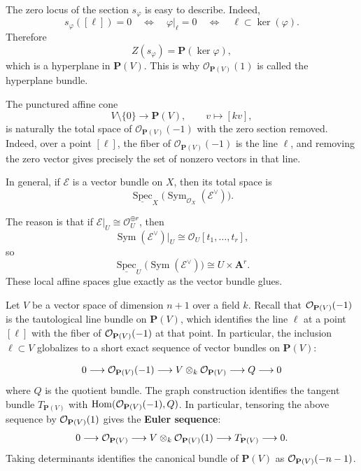 \documentclass[12pt]{article}
\begin{document}
The zero locus of the section \(s_\varphi\) is easy to describe. Indeed,
\[
    s_\varphi([\ell])=0
    \quad\Longleftrightarrow\quad
    \varphi|_\ell=0
    \quad\Longleftrightarrow\quad
    \ell\subset \ker(\varphi).
\]
Therefore
\[
    Z(s_\varphi)=\mathbf P(\ker \varphi),
\]
which is a hyperplane in \(\mathbf P(V)\). This is why \(\mathcal O_{\mathbf P(V)}(1)\) is called the hyperplane bundle.

\begin{remark}
    The punctured affine cone
    \[
        V\setminus \{0\}\longrightarrow \mathbf P(V),\qquad v\longmapsto [kv],
    \]
    is naturally the total space of \(\mathcal O_{\mathbf P(V)}(-1)\) with the zero section removed. Indeed, over a point \([\ell]\), the fiber of \(\mathcal O_{\mathbf P(V)}(-1)\) is the line \(\ell\), and removing the zero vector gives precisely the set of nonzero vectors in that line.
\end{remark}
In general, if \(\mathcal E\) is a vector bundle on \(X\), then its total space is
\[
    \underline{\operatorname{Spec}}_X\!\bigl(\operatorname{Sym}_{\mathcal O_X}(\mathcal E^\vee)\bigr).
\]

The reason is that if \(\mathcal E|_U \cong \mathcal O_U^{\oplus r}\), then
\[
    \operatorname{Sym}(\mathcal E^\vee)|_U
    \cong
    \mathcal O_U[t_1,\dots,t_r],
\]
so
\[
    \underline{\operatorname{Spec}}_U\!\bigl(\operatorname{Sym}(\mathcal E^\vee)\bigr)
    \cong
    U\times \mathbf A^r.
\]
These local affine spaces glue exactly as the vector bundle glues.


\begin{example}
     Let \(V\) be a vector space of dimension \(n+1\) over a field \(k\). Recall that ${\mathcal{O}}_{\mathbf P(V)}(-1)$ is the tautological line bundle on $\mathbf P(V)$, which identifies the line $\ell$ at a point $[\ell]$ with the fiber of ${\mathcal{O}}_{\mathbf P(V)}(-1)$ at that point. In particular, the inclusion $\ell \subset V$ globalizes to a short exact sequence of vector bundles on $\mathbf P(V)$:

    \[
        0 \longrightarrow {\mathcal{O}}_{\mathbf P(V)}(-1) \longrightarrow V \otimes_k {\mathcal{O}}_{\mathbf P(V)} \longrightarrow Q \longrightarrow 0
    \]
    where $Q$ is the quotient bundle. The graph construction identifies the tangent bundle $T_{\mathbf P(V)}$ with $\operatorname{Hom}({\mathcal{O}}_{\mathbf P(V)}(-1), Q)$. In particular, tensoring the above sequence by ${\mathcal{O}}_{\mathbf P(V)}(1)$ gives the \textbf{Euler sequence}:
    \begin{align*}
        0 \longrightarrow {\mathcal{O}}_{\mathbf P(V)} \longrightarrow V \otimes_k {\mathcal{O}}_{\mathbf P(V)}(1) \longrightarrow T_{\mathbf P(V)} \longrightarrow 0.
    \end{align*}
    Taking determinants identifies the canonical bundle of $\mathbf P(V)$ as ${\mathcal{O}}_{\mathbf P(V)}(-n-1)$.
\end{example}
\end{document}
